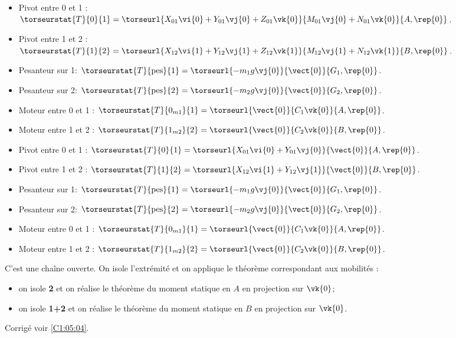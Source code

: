\ifprof
\begin{itemize}
\item Pivot entre 0 et 1 : $\torseurstat{T}{0}{1}=\torseurl{X_{01}\vi{0}+Y_{01}\vj{0}+Z_{01}\vk{0}}{M_{01}\vj{0}+N_{01}\vk{0}}{A,\rep{0}}$.
\item Pivot entre 1 et 2 : $\torseurstat{T}{1}{2}=\torseurl{X_{12}\vi{1}+Y_{12}\vj{1}+Z_{12}\vk{1}}{M_{12}\vj{1}+N_{12}\vk{1}}{B,\rep{0}}$.
\item Pesanteur sur 1: $\torseurstat{T}{\text{pes}}{1}=\torseurl{-m_1g\vj{0}}{\vect{0}}{G_1,\rep{0}}$.
\item Pesanteur sur 2: $\torseurstat{T}{\text{pes}}{2}=\torseurl{-m_2g\vj{0}}{\vect{0}}{G_2,\rep{0}}$.
\item Moteur entre 0 et 1 : $\torseurstat{T}{0_{m1}}{1}=\torseurl{\vect{0}}{C_1\vk{0}}{A,\rep{0}}$.
\item Moteur entre 1 et 2 : $\torseurstat{T}{1_{m2}}{2}=\torseurl{\vect{0}}{C_2\vk{0}}{B,\rep{0}}$.
\end{itemize}
\else
\fi

\ifprof
\begin{itemize}
\item Pivot entre 0 et 1 : $\torseurstat{T}{0}{1}=\torseurl{X_{01}\vi{0}+Y_{01}\vj{0}}{\vect{0}}{A,\rep{0}}$.
\item Pivot entre 1 et 2 : $\torseurstat{T}{1}{2}=\torseurl{X_{12}\vi{1}+Y_{12}\vj{1}}{\vect{0}}{B,\rep{0}}$.
\item Pesanteur sur 1: $\torseurstat{T}{\text{pes}}{1}=\torseurl{-m_1g\vj{0}}{\vect{0}}{G_1,\rep{0}}$.
\item Pesanteur sur 2: $\torseurstat{T}{\text{pes}}{2}=\torseurl{-m_2g\vj{0}}{\vect{0}}{G_2,\rep{0}}$.
\item Moteur entre 0 et 1 : $\torseurstat{T}{0_{m1}}{1}=\torseurl{\vect{0}}{C_1\vk{0}}{A,\rep{0}}$.
\item Moteur entre 1 et 2 : $\torseurstat{T}{1_{m2}}{2}=\torseurl{\vect{0}}{C_2\vk{0}}{B,\rep{0}}$.
\end{itemize}
\else
\fi

\ifprof
C'est une chaîne ouverte. On isole l'extrémité et on applique le théorème correspondant aux mobilités : 
\begin{itemize}
\item on isole \textbf{2} et on réalise le théorème du moment statique en $A$ en projection sur $\vk{0}$;
\item on isole \textbf{1+2} et on réalise le théorème du moment statique en $B$ en projection sur $\vk{0}$.
\end{itemize}
\else
\fi

\else
\fi




\ifprof
\else
\begin{flushright}
\footnotesize{Corrigé  voir \ref{C1:05:04}.}
\end{flushright}%
\fi